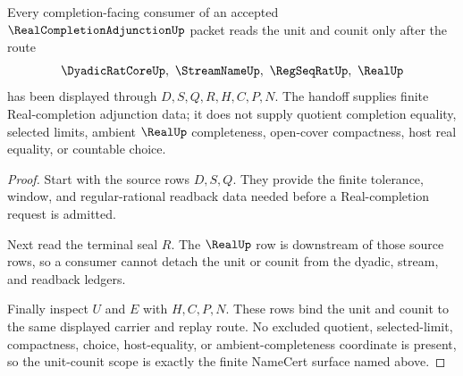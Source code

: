 \begin{theorem}
\label{thm:real-completion-adjunction-unit-counit-scope}
Every completion-facing consumer of an accepted $\RealCompletionAdjunctionUp$ packet reads the unit and counit only after the route
$$
\DyadicRatCoreUp,\ \StreamNameUp,\ \RegSeqRatUp,\ \RealUp
$$
has been displayed through $D,S,Q,R,H,C,P,N$. The handoff supplies finite Real-completion adjunction data; it does not supply quotient completion equality, selected limits, ambient $\RealUp$ completeness, open-cover compactness, host real equality, or countable choice.
\end{theorem}
\begin{proof}
Start with the source rows $D,S,Q$. They provide the finite tolerance, window, and regular-rational readback data needed before a Real-completion request is admitted.

Next read the terminal seal $R$. The $\RealUp$ row is downstream of those source rows, so a consumer cannot detach the unit or counit from the dyadic, stream, and readback ledgers.

Finally inspect $U$ and $E$ with $H,C,P,N$. These rows bind the unit and counit to the same displayed carrier and replay route. No excluded quotient, selected-limit, compactness, choice, host-equality, or ambient-completeness coordinate is present, so the unit-counit scope is exactly the finite NameCert surface named above.
\end{proof}




